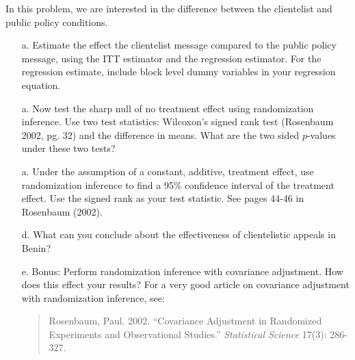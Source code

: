\documentclass{article}
\begin{document}
\noindent In this problem, we are interested in the difference between
the clientelist and public policy conditions.  
\begin{itemize}
\item[a.] Estimate the effect the clientelist message compared to the
  public policy message, using the ITT estimator and the regression
  estimator. For the regression estimate, include block level dummy
  variables in your regression equation.  
\item[a.] Now test the sharp null
  of no treatment effect using randomization inference. Use two test
  statistics: Wilcoxon’s signed rank test (Rosenbaum 2002, pg. 32) and
  the difference in means. What are the two sided $p$-values under these
  two tests?  
\item[a.] Under the assumption of a constant, additive, treatment
  effect, use randomization inference to find a 95\% confidence
  interval of the treatment effect. Use the signed rank as your test
  statistic. See pages 44-46 in Rosenbaum (2002).
\item[d.] What can you conclude about the effectiveness of clientelistic
  appeals in Benin?
\item[e.] Bonus: Perform randomization inference with covariance adjustment. How does this effect your results? For a very good article on  covariance adjustment with randomization inference, see: 
\begin{quote}
Rosenbaum, Paul. 2002. “Covariance Adjustment in Randomized Experiments and Observational Studies.” \textit{Statistical Science} 17(3): 286-327. 
\end{quote}
\end{itemize}
\end{document}
